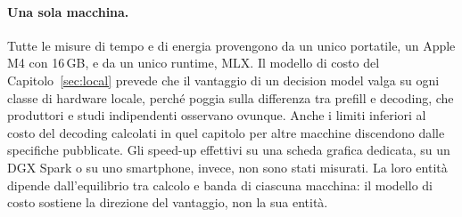 \paragraph{Una sola macchina.} Tutte le misure di tempo e di energia provengono da un unico portatile, un Apple M4 con
16\,GB, e da un unico runtime, MLX. Il modello di costo del Capitolo~\ref{sec:local} prevede che il vantaggio di un
decision model valga su ogni classe di hardware locale, perché poggia sulla differenza tra prefill e decoding, che produttori
e studi indipendenti osservano ovunque. Anche i limiti inferiori al costo del decoding calcolati in quel capitolo per
altre macchine discendono dalle specifiche pubblicate. Gli speed-up effettivi su una scheda grafica dedicata, su un DGX
Spark o su uno smartphone, invece, non sono stati misurati. La loro entità dipende dall'equilibrio tra calcolo e banda di
ciascuna macchina: il modello di costo sostiene la direzione del vantaggio, non la sua entità.
